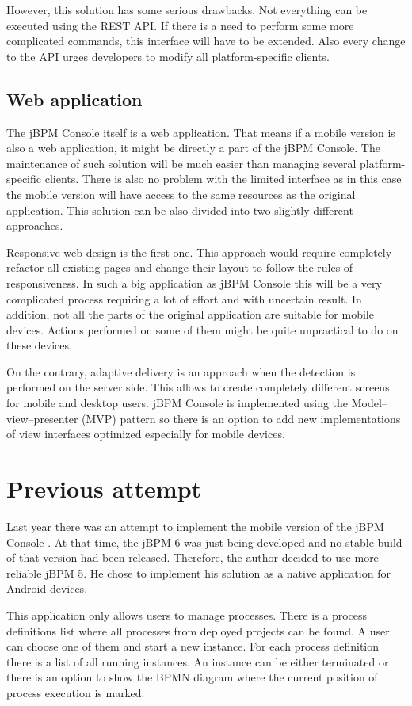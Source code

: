 \documentclass[12pt,oneside,final]{fithesis2}
\begin{document}
However, this solution has some serious drawbacks.
Not everything can be executed using the REST API.
If there is a need to perform some more complicated commands, this interface will have to be extended.
Also every change to the API urges developers to modify all platform-specific clients.

\subsection{Web application}
\label{sec:webapp}
The jBPM Console itself is a web application.
That means if a mobile version is also a web application, it might be directly a part of the jBPM Console.
The maintenance of such solution will be much easier than managing several platform-specific clients.
There is also no problem with the limited interface as in this case the mobile version will have access to the same resources as the original application.
This solution can be also divided into two slightly different approaches.

Responsive web design is the first one.
This approach would require completely refactor all existing pages and change their layout to follow the rules of responsiveness.
In such a big application as jBPM Console this will be a very complicated process requiring a lot of effort and with uncertain result.
In addition, not all the parts of the original application are suitable for mobile devices.
Actions performed on some of them might be quite unpractical to do on these devices.

On the contrary, adaptive delivery is an approach when the detection is performed on the server side.
This allows to create completely different screens for mobile and desktop users.
jBPM Console is implemented using the Model–view–presenter (MVP) pattern so there is an option to add new implementations of view interfaces optimized especially for mobile devices.

\section{Previous attempt}
Last year there was an attempt to implement the mobile version of the jBPM Console \cite{petovsky13}.
At that time, the jBPM 6 was just being developed and no stable build of that version had been released.
Therefore, the author decided to use more reliable jBPM 5.
He chose to implement his solution as a native application for Android devices.

This application only allows users to manage processes.
There is a process definitions list where all processes from deployed projects can be found.
A user can choose one of them and start a new instance.
For each process definition there is a list of all running instances.
An instance can be either terminated or there is an option to show the BPMN diagram where the current position of process execution is marked.
\end{document}
